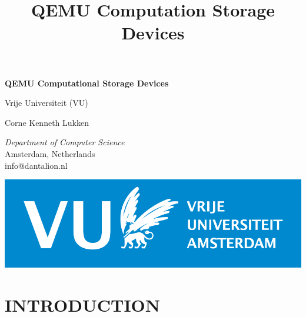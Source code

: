 \documentclass[conference]{IEEEtran}
\title{QEMU Computation Storage Devices%
}
\begin{document}
\begin{titlepage}
\begingroup
\centering
{\LARGE\bfseries QEMU Computational Storage Devices}

\vspace{1cm}

{\Large Vrije Universiteit (VU)}

\vspace{0.5cm}

{Corne Kenneth Lukken}

{\textit{Department of Computer Science} \\
Amsterdam, Netherlands \\
info@dantalion.nl}

\vspace{4.0cm}


\vfill
\endgroup
\hfill
\begin{minipage}{0.3\textwidth}
\begin{flushright}
	\includegraphics[width=\textwidth]{resources/images/vu-logo.png}
\end{flushright}
\end{minipage}
\end{titlepage}

\clearpage
\onecolumn

\hypersetup{
	linkcolor=black
}

\renewcommand{\contentsname}{CONTENTS}
\tableofcontents{}

\hypersetup{
	linkcolor=blue
}

\twocolumn

\section*{INTRODUCTION}
\end{document}
